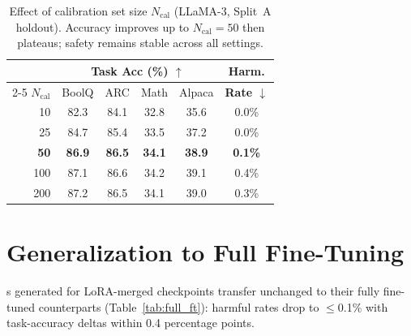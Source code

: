 \begin{table}[htbp]
	\centering
	\small
	\renewcommand{\arraystretch}{1.0}
	\setlength{\tabcolsep}{5pt}
	\begin{tabular}{@{}rccccc@{}}
		\toprule
		& \multicolumn{4}{c}{\textbf{Task Acc (\%) $\uparrow$}} & \textbf{Harm.} \\
		\cmidrule(lr){2-5}
		$N_\text{cal}$ & BoolQ & ARC & Math & Alpaca & \textbf{Rate $\downarrow$} \\
		\midrule
		10  & 82.3 & 84.1 & 32.8 & 35.6 & 0.0\% \\
		25  & 84.7 & 85.4 & 33.5 & 37.2 & 0.0\% \\
		\textbf{50}  & \textbf{86.9} & \textbf{86.5} & \textbf{34.1} & \textbf{38.9} & \textbf{0.1\%} \\
		100 & 87.1 & 86.6 & 34.2 & 39.1 & 0.4\% \\
		200 & 87.2 & 86.5 & 34.1 & 39.0 & 0.3\% \\
		\bottomrule
	\end{tabular}
	\caption{Effect of calibration set size $N_\text{cal}$ (LLaMA-3, Split~A holdout). Accuracy improves up to $N_\text{cal}{=}50$ then plateaus; safety remains stable across all settings.}
	\label{tab:ablation_ncal}
\end{table}



\section{Generalization to Full Fine-Tuning}
\label{app:fullft}
\ssn{}s generated for LoRA-merged checkpoints transfer unchanged to their fully fine-tuned counterparts (Table~\ref{tab:full_ft}): harmful rates drop to $\leq$0.1\% with task-accuracy deltas within 0.4 percentage points.

